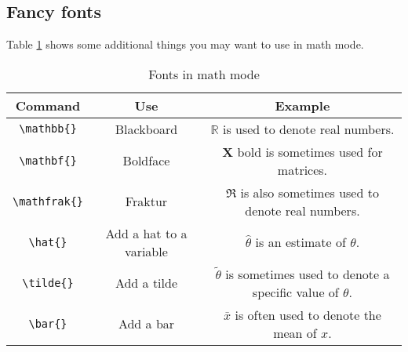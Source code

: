 \subsection{Fancy fonts}

Table \ref{tab:fonts} shows some additional things you may want to use in math mode.

\begin{table}[h]
	\centering
	\label{tab:fonts}
	\caption{Fonts in math mode}
\begin{small}
  \begin{center}
    \begin{tabular}{c c c}
      \hline
Command & Use & Example \\ \hline
\verb|\mathbb{}| & Blackboard & $\mathbb{R}$ is used to denote real numbers.\\
\verb|\mathbf{}| & Boldface & $\mathbf{X}$ bold is sometimes used for matrices.\\
\verb|\mathfrak{}| & Fraktur & $\mathfrak{R}$ is also sometimes used to denote real numbers.\\
\verb|\hat{}| & Add a hat to a variable & $\hat{\theta}$ is an estimate of $\theta$.\\
\verb|\tilde{}| & Add a tilde & $\tilde{\theta}$ is sometimes used to denote a specific value of $\theta$.\\
\verb|\bar{}| & Add a bar & $\bar{x}$ is often used to denote the mean of $x$.\\



      \hline
    \end{tabular}
  \end{center}
\end{small}
\end{table}



